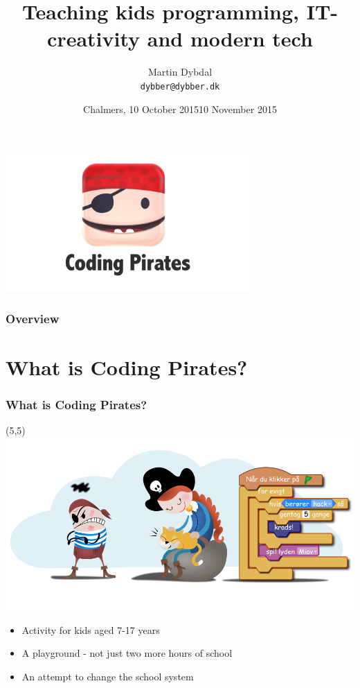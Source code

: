 \documentclass{beamer}
\title[APL \& TAIL] %
  {Teaching kids programming, IT-creativity and modern tech} %
\author{\footnotesize{Martin Dybdal} \\ \footnotesize{\texttt{dybber@dybber.dk}}}
\institute {
DIKU \\
University of Copenhagen
}
\date{\footnotesize{Chalmers, 10 October 2015}}
\date{10 November 2015}
\begin{document}
{
\begin{frame}
  \begin{center}
    \includegraphics[width=0.7\textwidth]{imagery/codingpirates.png}
  \end{center}
\vspace{-1cm}
\titlepage
\end{frame}
}


\begin{frame}
\frametitle{Overview}
\tableofcontents
\end{frame}


\section{What is Coding Pirates?}
\begin{frame}
\frametitle{What is Coding Pirates?}
\begin{textblock}{20}(5,5)
 \includegraphics[width=\textwidth]{imagery/cpthack-and-miss1337.png}
\end{textblock}

\begin{itemize}
\item Activity for kids aged 7-17 years
\item A playground - not just two more hours of school
\item An attempt to change the school system
\end{itemize}
\vspace{2cm}
\end{frame}
\end{document}
